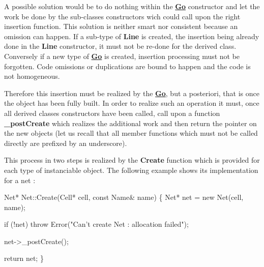 A possible solution would be to do nothing within the {\bfseries \hyperlink{classHurricane_1_1Go}{Go}} constructor and let the work be done by the sub-\/classes constructors wich could call upon the right insertion function. This solution is neither smart nor consistent because an omission can happen. If a sub-\/type of {\bfseries Line} is created, the insertion being already done in the {\bfseries Line} constructor, it must not be re-\/done for the derived class. Conversely if a new type of {\bfseries \hyperlink{classHurricane_1_1Go}{Go}} is created, insertion processing must not be forgotten. Code omissions or duplications are bound to happen and the code is not homogeneous.

Therefore this insertion must be realized by the {\bfseries \hyperlink{classHurricane_1_1Go}{Go}}, but a posteriori, that is once the object has been fully built. In order to realize such an operation it must, once all derived classes constructors have been called, call upon a function {\bfseries \+\_\+post\+Create} which realizes the additional work and then return the pointer on the new objects (let us recall that all member functions which must not be called directly are prefixed by an underscore).

This process in two steps is realized by the {\bfseries Create} function which is provided for each type of instanciable object. The following example shows its implementation for a net \+: 
\begin{DoxyCode}
Net* Net::Create(Cell* cell, \textcolor{keyword}{const} Name& name)
\{
   Net* net = \textcolor{keyword}{new} Net(cell, name);
 
   \textcolor{keywordflow}{if} (!net)
      \textcolor{keywordflow}{throw} Error(\textcolor{stringliteral}{"Can't create Net : allocation failed"});
 
   net->\_postCreate();
 
   \textcolor{keywordflow}{return} net;
\}
\end{DoxyCode}



